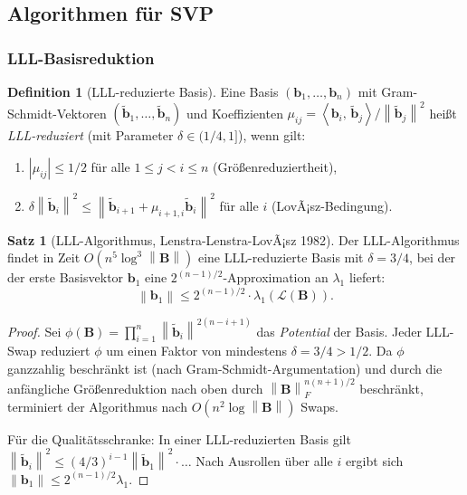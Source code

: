 ﻿\documentclass[a4paper,12pt]{article}
\theoremstyle{definition}
\newtheorem{definition}{Definition}
\newtheorem{satz}{Satz}
\newcommand{\Lat}{\mathcal{L}}
\newcommand{\B}{\mathbf{B}}
\newcommand{\norm}[1]{\left\|#1\right\|}
\newcommand{\innerprod}[2]{\left\langle #1,\, #2 \right\rangle}
\begin{document}
\subsection{Algorithmen für SVP}

\subsubsection{LLL-Basisreduktion}

\begin{definition}[LLL-reduzierte Basis]
Eine Basis $(\mathbf{b}_1, \ldots, \mathbf{b}_n)$ mit Gram-Schmidt-Vektoren
$(\tilde{\mathbf{b}}_1, \ldots, \tilde{\mathbf{b}}_n)$ und Koeffizienten
$\mu_{ij} = \innerprod{\mathbf{b}_i}{\tilde{\mathbf{b}}_j}/\norm{\tilde{\mathbf{b}}_j}^2$
heißt \emph{LLL-reduziert} (mit Parameter $\delta \in (1/4, 1]$), wenn gilt:
\begin{enumerate}
    \item $|\mu_{ij}| \leq 1/2$ für alle $1 \leq j < i \leq n$ \quad (Größenreduziertheit),
    \item $\delta \norm{\tilde{\mathbf{b}}_i}^2 \leq \norm{\tilde{\mathbf{b}}_{i+1} + \mu_{i+1,i} \tilde{\mathbf{b}}_i}^2$
          für alle $i$ \quad (LovÃ¡sz-Bedingung).
\end{enumerate}
\end{definition}

\begin{satz}[LLL-Algorithmus, Lenstra-Lenstra-LovÃ¡sz 1982]
\label{satz:lll}
Der LLL-Algorithmus findet in Zeit $O(n^5 \log^3 \norm{\B})$
eine LLL-reduzierte Basis mit $\delta = 3/4$, bei der der erste Basisvektor
$\mathbf{b}_1$ eine $2^{(n-1)/2}$-Approximation an $\lambda_1$ liefert:
\[
    \norm{\mathbf{b}_1} \leq 2^{(n-1)/2} \cdot \lambda_1(\Lat(\B)).
\]
\end{satz}

\begin{proof}
Sei $\phi(\B) = \prod_{i=1}^{n} \norm{\tilde{\mathbf{b}}_i}^{2(n-i+1)}$ das
\emph{Potential} der Basis.
Jeder LLL-Swap reduziert $\phi$ um einen Faktor von mindestens $\delta = 3/4 > 1/2$.
Da $\phi$ ganzzahlig beschränkt ist (nach Gram-Schmidt-Argumentation)
und durch die anfängliche Größenreduktion nach oben durch $\norm{\B}_F^{n(n+1)/2}$ beschränkt,
terminiert der Algorithmus nach $O(n^2 \log \norm{\B})$ Swaps.

Für die Qualitätsschranke: In einer LLL-reduzierten Basis gilt
$\norm{\tilde{\mathbf{b}}_i}^2 \leq (4/3)^{i-1} \norm{\tilde{\mathbf{b}}_1}^2 \cdot \ldots$
Nach Ausrollen über alle $i$ ergibt sich $\norm{\mathbf{b}_1} \leq 2^{(n-1)/2} \lambda_1$.
\end{proof}
\end{document}

